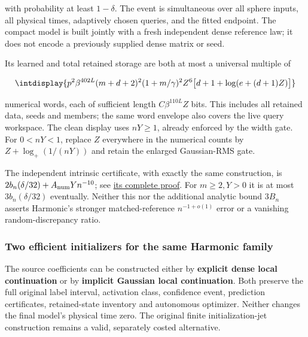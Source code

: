 
with probability at least \(1-\delta\). The event is simultaneous over all sphere inputs, all physical times, adaptively chosen queries, and the fitted endpoint. The compact model is built jointly with a fresh independent dense reference law; it does not encode a previously supplied dense matrix or seed.



Its learned and total retained storage are both at most a universal multiple of


\begingroup\renewcommand{\theHequation}{intdisplay.15}
\begin{equation}
\intdisplay{
p^2\beta^{402L}(m+d+2)^2(1+m/\gamma)^2Z^6
\bigl[d+1+\log(e+(d+1)Z)\bigr]
}
\label{int:eq-0012-seeded-word-storage}
\end{equation}
\endgroup


numerical words, each of sufficient length \(C\beta^{110L}Z\) bits. This includes all retained data, seeds and members; the same word envelope also covers the live query workspace. The clean display uses \(nY\ge1\), already enforced by the width gate. For \(0<nY<1\), replace \(Z\) everywhere in the numerical counts by \(Z+\log_+(1/(nY))\) and retain the enlarged Gaussian-RMS gate.



The independent intrinsic certificate, with exactly the same construction, is \(2b_n(\delta/32)+A_{\rm num}Yn^{-10}\); see \hyperref[int:intrinsic-variability-comparison]{its complete proof}. For \(m\ge2,\allowbreak Y>0\) it is at most \(3b_n(\delta/32)\) eventually. Neither this nor the additional analytic bound \(3B_n\) asserts Harmonic's stronger matched-reference \(n^{-1+o(1)}\) error or a vanishing random-discrepancy ratio.


\subsubsection{Two efficient initializers for the same Harmonic family}
\label{int:harmonic-setup-headline}


The source coefficients can be constructed either by \textbf{explicit dense local continuation} or by \textbf{implicit Gaussian local continuation}. Both preserve the full original label interval, activation class, confidence event, prediction certificates, retained-state inventory and autonomous optimizer. Neither changes the final model's physical time zero. The original finite initialization-jet construction remains a valid, separately costed alternative.


